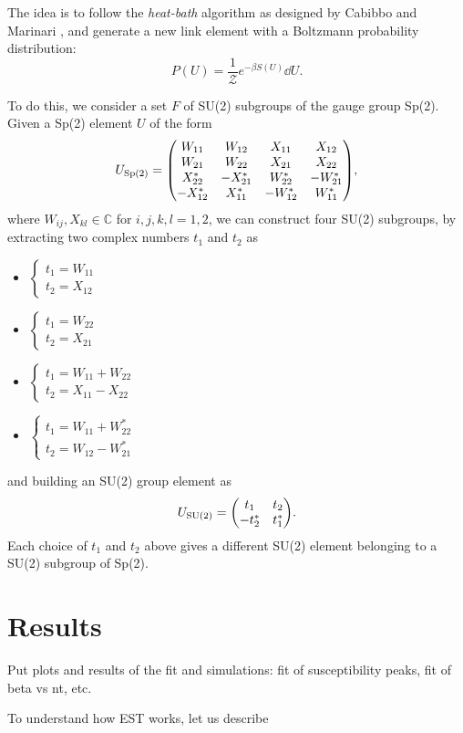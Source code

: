 \documentclass[reqno,12pt]{article}
\numberwithin{equation}{section}
\begin{document}
The idea is to follow the \textit{heat-bath} algorithm as designed by Cabibbo and Marinari \cite{cabibbo}, and generate a new link
element with a Boltzmann probability distribution:
\begin{equation}
	P(U) = \frac{1}{\mathcal{Z}} e^{-\beta S(U)} \dd{U}.
\end{equation}  

To do this, we consider a set $F$ of SU(2) subgroups of the gauge group Sp(2). Given a Sp(2) element $U$ of the form
\begin{equation}
	U_\text{Sp(2)} = \mqty(
		W_{11} & W_{12} & X_{11} & X_{12} \\
		W_{21} & W_{22} & X_{21} & X_{22} \\
		X^*_{22} & -X^*_{21} & W^*_{22} & -W^*_{21} \\
		-X^*_{12} & X^*_{11} & -W^*_{12} & W^*_{11}
	),
\end{equation}
where $W_{ij}, X_{kl} \in \mathbb{C}$ for $i,j,k,l = 1, 2$, 
we can construct four SU(2) subgroups, by extracting two complex numbers $t_1$ and $t_2$ as
\begin{itemize}
	\item $\begin{cases} t_1 = W_{11} \\ t_2 = X_{12} \end{cases}$
	\item $\begin{cases} t_1 = W_{22} \\ t_2 = X_{21} \end{cases}$
	\item $\begin{cases} t_1 = W_{11} + W_{22} \\ t_2 = X_{11} - X_{22} \end{cases}$
	\item $\begin{cases} t_1 = W_{11} + W^*_{22} \\ t_2 = W_{12} - W^*_{21} \end{cases}$
\end{itemize}
and building an SU(2) group element as
\begin{equation}
	U_\text{SU(2)} = \mqty(t_1 & t_2 \\ -t_2^* & t_1^*).
\end{equation}
Each choice of $t_1$ and $t_2$ above gives a different SU(2) element belonging to a SU(2) subgroup of Sp(2).

\section{Results}
Put plots and results of the fit and simulations: fit of susceptibility peaks, fit of beta vs nt, etc.


To understand how EST works, let us describe 

\printbibliography
\end{document}
